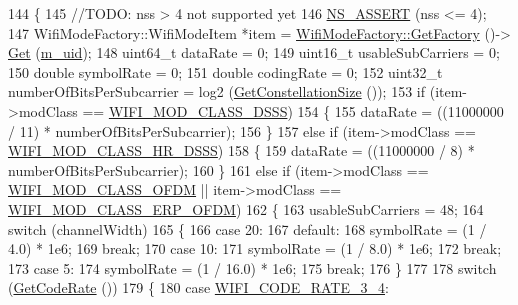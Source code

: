 \begin{DoxyCode}
144 \{
145   \textcolor{comment}{//TODO: nss > 4 not supported yet}
146   \hyperlink{assert_8h_a6dccdb0de9b252f60088ce281c49d052}{NS\_ASSERT} (nss <= 4);
147   WifiModeFactory::WifiModeItem *item = \hyperlink{classns3_1_1WifiModeFactory_a9c6f695d733355dee8d74bd1709868fc}{WifiModeFactory::GetFactory} ()->
      \hyperlink{classns3_1_1WifiModeFactory_a3086868810ff4347e31c63027726f544}{Get} (\hyperlink{classns3_1_1WifiMode_ad63e4633ba59d019abfb07de0858727f}{m\_uid});
148   uint64\_t dataRate = 0;
149   uint16\_t usableSubCarriers = 0;
150   \textcolor{keywordtype}{double} symbolRate = 0;
151   \textcolor{keywordtype}{double} codingRate = 0;
152   uint32\_t numberOfBitsPerSubcarrier = log2 (\hyperlink{classns3_1_1WifiMode_a28bbc436203fd3332da6cc61909af8f1}{GetConstellationSize} ());
153   \textcolor{keywordflow}{if} (item->modClass == \hyperlink{namespacens3_aa999e1221606a2b21b1eb33c2007c217aed8070e1ee089724d73fe63030cc112c}{WIFI\_MOD\_CLASS\_DSSS})
154     \{
155       dataRate = ((11000000 / 11) * numberOfBitsPerSubcarrier);
156     \}
157   \textcolor{keywordflow}{else} \textcolor{keywordflow}{if} (item->modClass == \hyperlink{namespacens3_aa999e1221606a2b21b1eb33c2007c217a3c847bbae970f2de31e7b4eb7ff49840}{WIFI\_MOD\_CLASS\_HR\_DSSS})
158     \{
159       dataRate = ((11000000 / 8) * numberOfBitsPerSubcarrier);
160     \}
161   \textcolor{keywordflow}{else} \textcolor{keywordflow}{if} (item->modClass == \hyperlink{namespacens3_aa999e1221606a2b21b1eb33c2007c217a30a83a0318357c9611f09e6faadc8006}{WIFI\_MOD\_CLASS\_OFDM} || item->modClass == 
      \hyperlink{namespacens3_aa999e1221606a2b21b1eb33c2007c217afc1f5ef8d2c985f37a3224dd86ab014d}{WIFI\_MOD\_CLASS\_ERP\_OFDM})
162     \{
163       usableSubCarriers = 48;
164       \textcolor{keywordflow}{switch} (channelWidth)
165         \{
166         \textcolor{keywordflow}{case} 20:
167         \textcolor{keywordflow}{default}:
168           symbolRate = (1 / 4.0) * 1e6;
169           \textcolor{keywordflow}{break};
170         \textcolor{keywordflow}{case} 10:
171           symbolRate = (1 / 8.0) * 1e6;
172           \textcolor{keywordflow}{break};
173         \textcolor{keywordflow}{case} 5:
174           symbolRate = (1 / 16.0) * 1e6;
175           \textcolor{keywordflow}{break};
176         \}
177 
178       \textcolor{keywordflow}{switch} (\hyperlink{classns3_1_1WifiMode_a41fcb1abd2aa488145f2f43ca9ba8e1d}{GetCodeRate} ())
179         \{
180         \textcolor{keywordflow}{case} \hyperlink{namespacens3_aeaf3a86fd4bdb7829955238fba43e2ada705b2eb134214c4f87c2b07dfb59046a}{WIFI\_CODE\_RATE\_3\_4}:

\end{DoxyCode}
